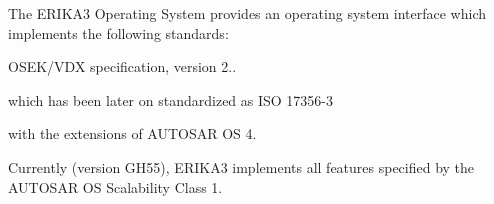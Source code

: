 The E\+R\+I\+K\+A3 Operating System provides an operating system interface which implements the following standards\+:


\begin{DoxyItemize}
\item O\+S\+E\+K/\+V\+DX specification, version 2..
\item which has been later on standardized as I\+SO 17356-\/3
\item with the extensions of A\+U\+T\+O\+S\+AR OS 4.
\end{DoxyItemize}

Currently (version G\+H55), E\+R\+I\+K\+A3 implements all features specified by the A\+U\+T\+O\+S\+AR OS Scalability Class 1. 
